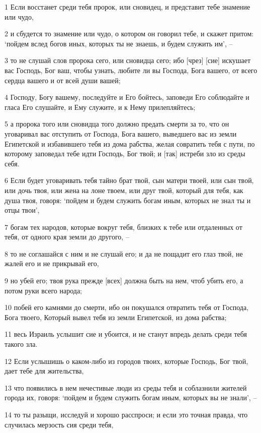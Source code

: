\par 1 Если восстанет среди тебя пророк, или сновидец, и представит тебе знамение или чудо,
\par 2 и сбудется то знамение или чудо, о котором он говорил тебе, и скажет притом: `пойдем вслед богов иных, которых ты не знаешь, и будем служить им', --
\par 3 то не слушай слов пророка сего, или сновидца сего; ибо [чрез] [сие] искушает вас Господь, Бог ваш, чтобы узнать, любите ли вы Господа, Бога вашего, от всего сердца вашего и от всей души вашей;
\par 4 Господу, Богу вашему, последуйте и Его бойтесь, заповеди Его соблюдайте и гласа Его слушайте, и Ему служите, и к Нему прилепляйтесь;
\par 5 а пророка того или сновидца того должно предать смерти за то, что он уговаривал вас отступить от Господа, Бога вашего, выведшего вас из земли Египетской и избавившего тебя из дома рабства, желая совратить тебя с пути, по которому заповедал тебе идти Господь, Бог твой; и [так] истреби зло из среды себя.
\par 6 Если будет уговаривать тебя тайно брат твой, сын матери твоей, или сын твой, или дочь твоя, или жена на лоне твоем, или друг твой, который для тебя, как душа твоя, говоря: `пойдем и будем служить богам иным, которых не знал ты и отцы твои',
\par 7 богам тех народов, которые вокруг тебя, близких к тебе или отдаленных от тебя, от одного края земли до другого, --
\par 8 то не соглашайся с ним и не слушай его; и да не пощадит его глаз твой, не жалей его и не прикрывай его,
\par 9 но убей его; твоя рука прежде [всех] должна быть на нем, чтоб убить его, а потом руки всего народа;
\par 10 побей его камнями до смерти, ибо он покушался отвратить тебя от Господа, Бога твоего, Который вывел тебя из земли Египетской, из дома рабства;
\par 11 весь Израиль услышит сие и убоится, и не станут впредь делать среди тебя такого зла.
\par 12 Если услышишь о каком-либо из городов твоих, которые Господь, Бог твой, дает тебе для жительства,
\par 13 что появились в нем нечестивые люди из среды тебя и соблазнили жителей города их, говоря: `пойдем и будем служить богам иным, которых вы не знали', --
\par 14 то ты разыщи, исследуй и хорошо расспроси; и если это точная правда, что случилась мерзость сия среди тебя,
